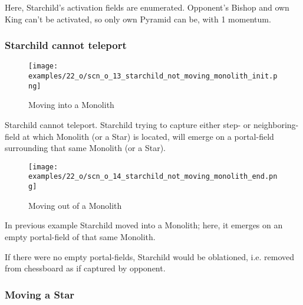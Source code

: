 Here, Starchild's activation fields are enumerated. Opponent's Bishop and own King
can't be activated, so only own Pyramid can be, with 1 momentum.

\clearpage %

\subsubsection*{Starchild cannot teleport}

\noindent
\begin{wrapfigure}[6]{l}{0.4\textwidth}
\centering
\texttt{[image: examples/22\_o/scn\_o\_13\_starchild\_not\_moving\_monolith\_init.png]}
\caption{Moving into a Monolith}
\label{fig:scn_o_13_starchild_not_moving_monolith_init}
\end{wrapfigure}
Starchild cannot teleport. Starchild trying to capture either step- or neighboring-field
at which Monolith (or a Star) is located, will emerge on a portal-field surrounding
that same Monolith (or a Star).

\vspace*{5.1\baselineskip}
\noindent
\begin{wrapfigure}[8]{l}{0.4\textwidth}
\centering
\texttt{[image: examples/22\_o/scn\_o\_14\_starchild\_not\_moving\_monolith\_end.png]}
\caption{Moving out of a Monolith}
\label{fig:scn_o_14_starchild_not_moving_monolith_end}
\end{wrapfigure}
In previous example Starchild moved into a Monolith; here, it emerges on an empty
portal-field of that same Monolith.

If there were no empty portal-fields, Starchild would be oblationed, i.e. removed
from chessboard as if captured by opponent.

\clearpage %

\subsubsection*{Moving a Star}

